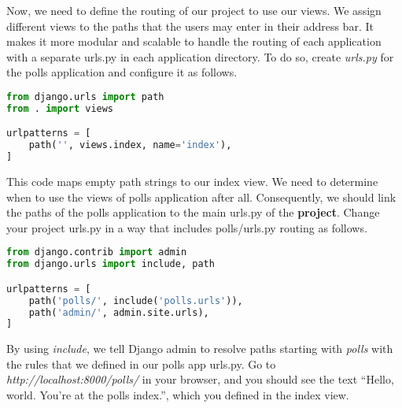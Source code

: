 \documentclass{homework}
\begin{document}
Now, we need to define the routing of our project to use our views. We assign different views to the paths that the users may enter in their address bar. It makes it more modular and scalable to handle the routing of each application with a separate urls.py in each application directory. To do so, create \textit{urls.py} for the polls application and configure it as follows.
\begin{lstlisting}[language=Python]
from django.urls import path
from . import views

urlpatterns = [
    path('', views.index, name='index'),
]
\end{lstlisting}
This code maps empty path strings to our index view. We need to determine when to use the views of polls application after all.
Consequently, we should link the paths of the polls application to the main urls.py of the \textbf{project}. Change your project urls.py in a way that includes polls/urls.py routing as follows.
\begin{lstlisting}[language=Python]
from django.contrib import admin
from django.urls import include, path

urlpatterns = [
    path('polls/', include('polls.urls')),
    path('admin/', admin.site.urls),
]
\end{lstlisting}
By using \textit{include}, we tell Django admin to resolve paths starting with \textit{polls} with the rules that we defined in our polls app urls.py. 
Go to \textit{http://localhost:8000/polls/} in your browser, and you should see the text “Hello, world. You’re at the polls index.”, which you defined in the index view.
\end{document}
